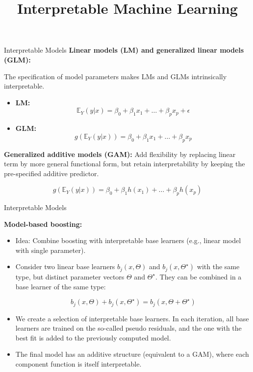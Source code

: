 \documentclass[11pt,compress,t,notes=noshow, xcolor=table]{beamer}
\title{Interpretable Machine Learning}
\institute{\href{https://compstat-lmu.github.io/lecture_iml/}{compstat-lmu.github.io/lecture\_iml}}
\date{}
\begin{document}


\newcommand{\titlefigure}{figure/open_blackbox}
\newcommand{\learninggoals}{
\item Interpretable Models}




\begin{vbframe}{Interpretable Models}
\textbf{Linear models (LM) and generalized linear models (GLM):}

The specification of model parameters makes LMs and GLMs intrinsically interpretable.

\begin{itemize}

\item \textbf{LM:}
$$
\mathbb{E}_Y(y \vert x) = \beta_0 + \beta_1 x_1 + \dots + \beta_p x_p + \epsilon
$$

\item \textbf{GLM:}
$$
g\left(\mathbb{E}_Y(y \vert x)\right) = \beta_0 + \beta_1 x_1 + \dots + \beta_p x_p
$$
\end{itemize}


\textbf{Generalized additive models (GAM):} Add flexibility by replacing linear term by more general functional form, but retain interpretability by keeping the pre-specified additive predictor.

$$
g\left(\mathbb{E}_Y(y \vert x)\right) = \beta_0 + \beta_1 h(x_1) + \dots + \beta_p h(x_p)
$$

\end{vbframe}


\begin{vbframe}{Interpretable Models}


\textbf{Model-based boosting:}

\begin{itemize}

\item 
Idea: Combine boosting with interpretable base learners (e.g., linear model with single parameter).
\item
Consider two linear base learners $b_j(x, \Theta)$ and $b_j(x, \Theta^{\star})$ with the same type, but distinct parameter vectors $\Theta$ and $\Theta^{\star}$. They can be combined in a base learner of the same type:

$$
b_j(x, \Theta) + b_j(x, \Theta^{\star}) = b_j(x, \Theta + \Theta^{\star})
$$
\item We create a selection of interpretable base learners. In each iteration, all base learners are trained on the so-called pseudo residuals, and the one with the best fit is added to the previously computed model.
\item The final model has an additive structure (equivalent to a GAM), where each component function is itself interpretable.
\end{itemize}



\end{vbframe}
\end{document}
